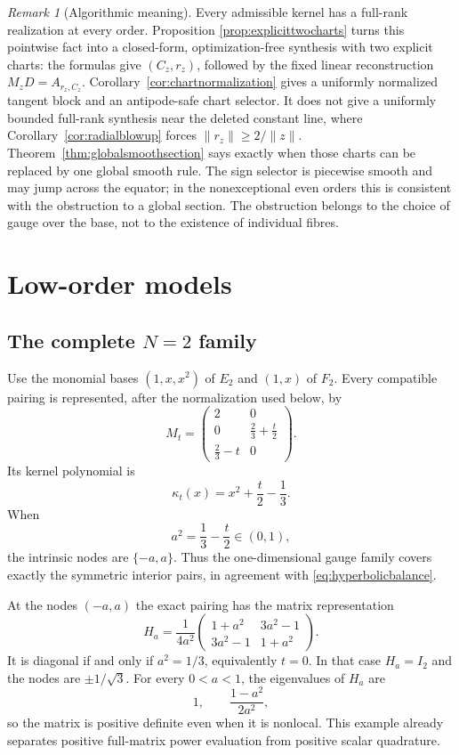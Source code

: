 \documentclass[11pt,a4paper]{article}
\theoremstyle{definition}
\theoremstyle{remark}
\newtheorem{remark}[theorem]{Remark}
\begin{document}
\begin{remark}[Algorithmic meaning]
Every admissible kernel has a full-rank realization at every order.  Proposition
\ref{prop:explicittwocharts} turns this pointwise fact into a closed-form, optimization-free
synthesis with two explicit charts: the formulas give $(C_z,r_z)$, followed by the fixed
linear reconstruction $M_zD=A_{r_z,C_z}$.  Corollary~\ref{cor:chartnormalization} gives a
uniformly normalized tangent block and an antipode-safe chart selector.  It does not give a
uniformly bounded full-rank synthesis near the deleted constant line, where
Corollary~\ref{cor:radialblowup} forces $\|r_z\|\geq2/\|z\|$.
Theorem~\ref{thm:globalsmoothsection} says exactly when those charts can be replaced by one
global smooth rule.  The sign selector is piecewise smooth and may jump across the equator;
in the nonexceptional even orders this is consistent with the obstruction to a global
section.  The obstruction belongs to the choice of gauge over the base, not to the existence
of individual fibres.
\end{remark}

\section{Low-order models}

\subsection{The complete \texorpdfstring{$N=2$}{N=2} family}

Use the monomial bases $(1,x,x^2)$ of $E_2$ and $(1,x)$ of $F_2$.  Every compatible pairing
is represented, after the normalization used below, by
\begin{equation}\label{eq:M2}
 M_t=
 \begin{pmatrix}
 2&0\\
 0&\frac23+\frac t2\\
 \frac23-t&0
 \end{pmatrix}.
\end{equation}
Its kernel polynomial is
\begin{equation}\label{eq:kappa2}
 \kappa_t(x)=x^2+\frac t2-\frac13.
\end{equation}
When
\[
 a^2=\frac13-\frac t2\in(0,1),
\]
the intrinsic nodes are $\{-a,a\}$.  Thus the one-dimensional gauge family covers exactly
the symmetric interior pairs, in agreement with \eqref{eq:hyperbolicbalance}.

At the nodes $(-a,a)$ the exact pairing has the matrix representation
\begin{equation}\label{eq:H2}
 H_a=\frac1{4a^2}
 \begin{pmatrix}
 1+a^2&3a^2-1\\
 3a^2-1&1+a^2
 \end{pmatrix}.
\end{equation}
It is diagonal if and only if $a^2=1/3$, equivalently $t=0$.  In that case
$H_a=I_2$ and the nodes are $\pm1/\sqrt3$.  For every $0<a<1$, the eigenvalues of $H_a$
are
\[
 1,\qquad \frac{1-a^2}{2a^2},
\]
so the matrix is positive definite even when it is nonlocal.  This example already separates
positive full-matrix power evaluation from positive scalar quadrature.
\end{document}
